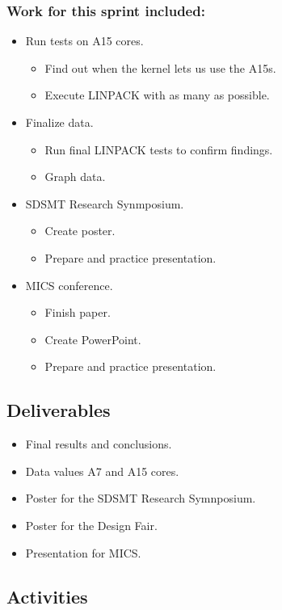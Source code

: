 \subsubsection*{Work for this sprint included:}
\begin{itemize}
	
	\item Run tests on A15 cores.
	\begin{itemize}
		\item Find out when the kernel lets us use the A15s.
		\item Execute LINPACK with as many as possible.
	\end{itemize}
	\item Finalize data.
	\begin{itemize}
		\item Run final LINPACK tests to confirm findings.
		\item Graph data.
	\end{itemize}
	\item SDSMT Research Synmposium.
	\begin{itemize}
		\item Create poster.
		\item Prepare and practice presentation.
	\end{itemize} 
	\item MICS conference.
	\begin{itemize}
		\item Finish paper.
		\item Create PowerPoint.
		\item Prepare and practice presentation.
	\end{itemize}
\end{itemize}

\subsection*{Deliverables}
\begin{itemize}
	\item Final results and conclusions.
	\item Data values A7 and A15 cores.
	\item Poster for the SDSMT Research Symnposium.
	\item Poster for the Design Fair.
	\item Presentation for MICS.
\end{itemize}

\subsection*{Activities}

